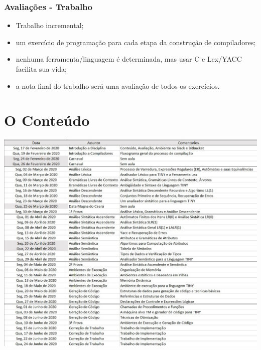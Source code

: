 \documentclass[table]{beamer}
\begin{document}
\begin{frame}
   \frametitle{Avaliações - Trabalho}
   \begin{itemize}
      \item Trabalho incremental;
      \item um exercício de programação para cada etapa da construção de compiladores;
      \item nenhuma ferramenta/linguagem é determinada, mas usar C e Lex/YACC facilita sua vida;
      \item a nota final do trabalho será uma avaliação de todos os exercícios.
   \end{itemize}
\end{frame}

\section{O Conteúdo}
\begin{frame}
   \includegraphics[scale=0.45]{figuras/programa.jpg}
\end{frame}
\end{document}
